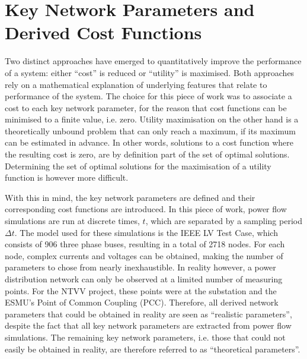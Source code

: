 \section{Key Network Parameters and Derived Cost Functions}
\label{ch1:sec:key-network-parameters}

Two distinct approaches have emerged to quantitatively improve the performance of a system: either ``cost'' is reduced or ``utility'' is maximised.
Both approaches rely on a mathematical explanation of underlying features that relate to performance of the system.
The choice for this piece of work was to associate a cost to each key network parameter, for the reason that cost functions can be minimised to a finite value, i.e. zero.
Utility maximisation on the other hand is a theoretically unbound problem that can only reach a maximum, if its maximum can be estimated in advance.
In other words, solutions to a cost function where the resulting cost is zero, are by definition part of the set of optimal solutions.
Determining the set of optimal solutions for the maximisation of a utility function is however more difficult.


With this in mind, the key network parameters are defined and their corresponding cost functions are introduced.
In this piece of work, power flow simulations are run at discrete times, $t$, which are separated by a sampling period $\Delta t$. 
The model used for these simulations is the IEEE LV Test Case, which consists of 906 three phase buses, resulting in a total of 2718 nodes.
For each node, complex currents and voltages can be obtained, making the number of parameters to chose from nearly inexhaustible.
In reality however, a power distribution network can only be observed at a limited number of measuring points.
For the NTVV project, these points were at the substation and the ESMU's Point of Common Coupling (PCC).
Therefore, all derived network parameters that could be obtained in reality are seen as ``realistic parameters'', despite the fact that all key network parameters are extracted from power flow simulations.
The remaining key network parameters, i.e. those that could not easily be obtained in reality, are therefore referred to as ``theoretical parameters''.

